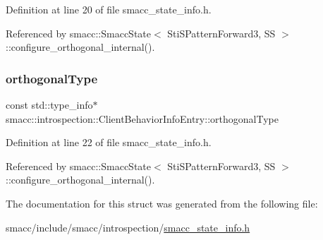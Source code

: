 Definition at line 20 of file smacc\+\_\+state\+\_\+info.\+h.



Referenced by smacc\+::\+Smacc\+State$<$ Sti\+S\+Pattern\+Forward3, S\+S $>$\+::configure\+\_\+orthogonal\+\_\+internal().

\mbox{\label{structsmacc_1_1introspection_1_1ClientBehaviorInfoEntry_aabffb57e6ee723ce1b2bdb6ad30c6993}} 
\subsubsection{\texorpdfstring{orthogonal\+Type}{orthogonalType}}
{\footnotesize\ttfamily const std\+::type\+\_\+info$\ast$ smacc\+::introspection\+::\+Client\+Behavior\+Info\+Entry\+::orthogonal\+Type}



Definition at line 22 of file smacc\+\_\+state\+\_\+info.\+h.



Referenced by smacc\+::\+Smacc\+State$<$ Sti\+S\+Pattern\+Forward3, S\+S $>$\+::configure\+\_\+orthogonal\+\_\+internal().



The documentation for this struct was generated from the following file\+:\begin{DoxyCompactItemize}
\item 
smacc/include/smacc/introspection/\hyperlink{smacc__state__info_8h}{smacc\+\_\+state\+\_\+info.\+h}\end{DoxyCompactItemize}
